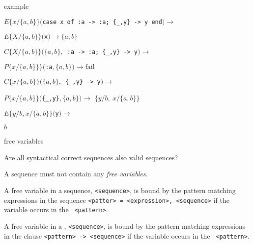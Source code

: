 \begin{frame}{example}

\begin{eval}
  \pause$E\lbrace x/\lbrace a,b\rbrace\rbrace(${\tt case x of :a -> :a; \{\_,y\} -> y end}$) \rightarrow$ 
\end{eval}

\begin{eval}
   \hspace{40pt}\pause$E\lbrace X/\lbrace a,b\rbrace\rbrace(${\tt x}$) \rightarrow \lbrace a,b\rbrace$
\end{eval}

\begin{eval}
   \pause $C\lbrace X/\lbrace a,b\rbrace\rbrace(\lbrace a,b\rbrace, ${\tt \ :a -> :a; \{\_,y\} -> y}$) \rightarrow$ 
\end{eval}
\begin{eval}
   \hspace{40pt}\pause $P\lbrace x/\lbrace a,b\rbrace\rbrace\rbrace( ${\tt :a}$, \lbrace a,b\rbrace) \rightarrow \mathrm{fail}$
\end{eval}

\begin{eval}
   \pause $C\lbrace x/\lbrace a,b\rbrace\rbrace(\lbrace a,b\rbrace, ${\tt \  \{\_,y\} -> y}$) \rightarrow$ 
\end{eval}
\begin{eval}
   \hspace{40pt}\pause $P\lbrace x/\lbrace a,b\rbrace\rbrace(${\tt \{\_,y\}}$, \lbrace a,b\rbrace) \rightarrow $ \pause $\lbrace y/b,\  x/\lbrace a,b\rbrace\rbrace$
\end{eval}

\begin{eval}
  \pause$E\lbrace y/b, x/\lbrace a,b\rbrace\rbrace(${\tt y}$) \rightarrow $
\end{eval}
\begin{eval}
  \pause$b$
\end{eval}
  
\end{frame}


\begin{frame}{free variables}

Are all syntactical correct sequences also valid sequences?

\pause\vspace{20pt}

A sequence must not contain any {\em free variables}.

\pause\vspace{10pt}

A free variable in a sequence, {\tt <sequence>}, is bound by the
pattern matching expressions in the sequence {\tt <patter> =
<expression>, <sequence>} if the variable occurs in the {\tt
<pattern>}.

\pause\vspace{10pt}

A free variable in a , {\tt <sequence>}, is bound by the
pattern matching expressions in the clause {\tt <pattern> -> <sequence>} if the variable occurs in the {\tt
<pattern>}.


\end{frame}

